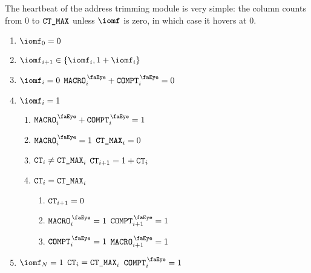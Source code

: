 The heartbeat of the address trimming module is very simple: the \ct{} column counts from $0$ to $\texttt{CT\_MAX}$ unless $\iomf$ is zero, in which case it hovers at $0$.
\begin{enumerate}
    \item $\iomf_{0} = 0$
    \item $\iomf_{i + 1} \in \{ \iomf_{i}, 1 + \iomf_{i} \}$
    \item \If $\iomf_{i} = 0$ \Then  $\isRlpUtilsMacro_{i} + \isRlpUtilsCompt_{i}   =0$
    \item \If $\iomf_{i} = 1$ \Then
	\begin{enumerate}
		\item $\isRlpUtilsMacro_{i} + \isRlpUtilsCompt_{i}   =1$
		\item $\isRlpUtilsMacro_{i} =1$ \Then $\texttt{CT\_MAX}_{i} = 0$
	    \item \If $\texttt{CT}_{i} \neq \texttt{CT\_MAX}_{i}$ \Then $\texttt{CT}_{i + 1} = 1 + \texttt{CT}_{i}$
	    \item \If $\texttt{CT}_{i} = \texttt{CT\_MAX}_{i}$ \Then 
	    \begin{enumerate}
	    	\item $\texttt{CT}_{i + 1} = 0$
	    	\item \If $\isRlpUtilsMacro_{i} =1$ \Then $\isRlpUtilsCompt_{i+1} =1$
	    	\item \If $\isRlpUtilsCompt_{i} =1$ \Then $\isRlpUtilsMacro_{i+1} =1$
	    \end{enumerate}
	\end{enumerate}
    \item \If $\iomf_{N} = 1$ \Then $\texttt{CT}_{i} = \texttt{CT\_MAX}_{i}$ \et $\isRlpUtilsCompt_{i} = 1$
\end{enumerate}
